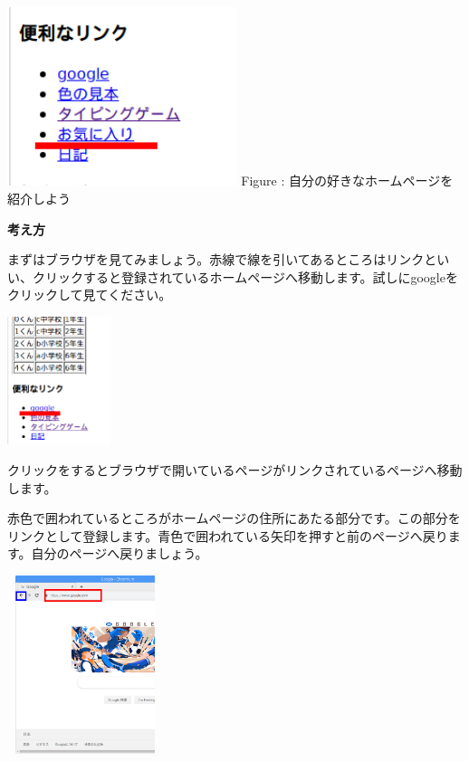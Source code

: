 \documentclass[a4paper,12pt]{jarticle}
\begin{document}
\centering
\begin{minipage}{7.593cm}
  {\upshape
    \includegraphics[width=6.71cm,height=5.221cm]{textbook-img193.png}
    \newline
    Figure :
    自分の好きなホームページを紹介しよう}
\end{minipage}



\bigskip

\flushleft

\textbf{考え方}



まずはブラウザを見てみましょう。赤線で線を引いてあるところはリンクといい、クリックすると登録されているホームページへ移動します。試しにgoogleをクリックして見てください。


\bigskip

\centering
\includegraphics[width=3.029cm,height=3.743cm]{textbook-img194.png}


\flushleft

\bigskip

クリックをするとブラウザで開いているページがリンクされているページへ移動します。

赤色で囲われているところがホームページの住所にあたる部分です。この部分をリンクとして登録します。青色で囲われている矢印を押すと前のページへ戻ります。自分のページへ戻りましょう。



\bigskip

\centering
\includegraphics[width=4.547cm,height=5.216cm]{textbook-img195.png}
\end{document}
